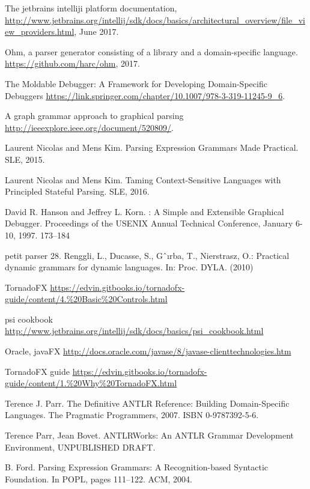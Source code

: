 
\begin{thebibliography}{9}

 The jetbrains intelliji platform documentation, 
	\url{http://www.jetbrains.org/intellij/sdk/docs/basics/architectural_overview/file_view_providers.html}, June 2017.

 Ohm, a parser generator consisting of a library and a domain-specific language.
	\url{https://github.com/harc/ohm}, 2017.	

 The Moldable Debugger: A Framework for Developing Domain-Specific Debuggers
	\url{https://link.springer.com/chapter/10.1007/978-3-319-11245-9_6}.

A graph grammar approach to graphical parsing
	\url{http://ieeexplore.ieee.org/document/520809/}.

Laurent Nicolas and Mens Kim.
Parsing Expression Grammars Made Practical.
SLE, 2015.

Laurent Nicolas and Mens Kim.
Taming Context-Sensitive Languages with Principled Stateful Parsing.
SLE, 2016.	

\bibitem{} 
David R. Hanson and Jeffrey L. Korn. :
A Simple and Extensible Graphical Debugger.
Proceedings of the USENIX Annual Technical Conference, January 6-10, 1997. 173–184

\bibitem{}
petit parser
28. Renggli, L., Ducasse, S., Gˆırba, T., Nierstrasz, O.: Practical dynamic grammars
for dynamic languages. In: Proc. DYLA. (2010)

\bibitem{} TornadoFX
	\url{https://edvin.gitbooks.io/tornadofx-guide/content/4.%20Basic%20Controls.html}

\bibitem{} psi cookbook
	\url{http://www.jetbrains.org/intellij/sdk/docs/basics/psi_cookbook.html}

 Oracle, javaFX
	\url{http://docs.oracle.com/javase/8/javase-clienttechnologies.htm}

 TornadoFX guide
	\url{https://edvin.gitbooks.io/tornadofx-guide/content/1.%20Why%20TornadoFX.html}

 Terence J. Parr. The Definitive ANTLR Reference: Building Domain-Specific Languages. 
	The Pragmatic Programmers, 2007. ISBN 0-9787392-5-6.

\bibitem{} Terence Parr, Jean Bovet. ANTLRWorks: An ANTLR Grammar Development Environment, UNPUBLISHED DRAFT.

\bibitem{} B. Ford. Parsing Expression Grammars: A Recognition-based Syntactic Foundation. In POPL, pages 111–122. ACM, 2004.

\end{thebibliography}